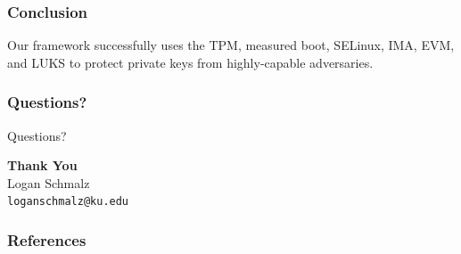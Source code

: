 \documentclass[
  notes,
]{beamer}
\begin{document}
\begin{frame}
  \frametitle{Conclusion}
  Our framework successfully uses the TPM, measured boot, SELinux, IMA, EVM, and LUKS to protect private keys
  from highly-capable adversaries.
\end{frame}
\begin{NoHyper}
\end{NoHyper}

\begin{frame}
  \frametitle{Questions?}

  \vfill
  \begin{center}
    \Huge Questions?
  \end{center}
  \vfill

  \textbf{Thank You} \\
  Logan Schmalz \\
  \texttt{loganschmalz@ku.edu}

\end{frame}
\begin{NoHyper}
\end{NoHyper}

\begin{frame}[allowframebreaks] %
  \frametitle{References}
  \footnotesize
\end{frame}

\appendix
\end{document}
